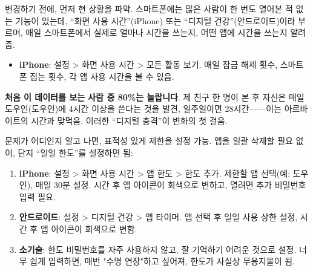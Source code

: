 


변경하기 전에, 먼저 현 상황을 파악. 스마트폰에는 많은 사람이 한 번도 열어본 적 없는 기능이 있는데, “화면 사용 시간”(iPhone) 또는 “디지털 건강”(안드로이드)이라 부르며, 매일 스마트폰에서 실제로 얼마나 시간을 쓰는지, 어떤 앱에 시간을 쓰는지 알려줌.

\begin{itemize}
  \item \textbf{iPhone}: 설정 > 화면 사용 시간 > 모든 활동 보기. 매일 잠금 해제 횟수, 스마트폰 집는 횟수, 각 앱 사용 시간을 볼 수 있음.
\end{itemize}

\textbf{처음 이 데이터를 보는 사람 중 80\%는 놀랍니다}. 제 친구 한 명이 본 후 자신은 매일 도우인(도우인)에 4시간 이상을 쓴다는 것을 발견, 일주일이면 28시간——이는 아르바이트의 시간과 맞먹음. 이러한 “디지털 충격”이 변화의 첫 걸음.


문제가 어디인지 알고 나면, 표적성 있게 제한을 설정 가능. 앱을 일괄 삭제할 필요 없이, 단지 “일일 한도”를 설정하면 됨:

\begin{enumerate}
  \item \textbf{iPhone}: 설정 > 화면 사용 시간 > 앱 한도 > 한도 추가. 제한할 앱 선택(예: 도우인), 매일 30분 설정. 시간 후 앱 아이콘이 회색으로 변하고, 열려면 추가 비밀번호 입력 필요.
  \item \textbf{안드로이드}: 설정 > 디지털 건강 > 앱 타이머. 앱 선택 후 일일 사용 상한 설정, 시간 후 앱 아이콘이 회색으로 변함.
  \item \textbf{소기술}: 한도 비밀번호를 자주 사용하지 않고, 잘 기억하기 어려운 것으로 설정. 너무 쉽게 입력하면, 매번 "수명 연장"하고 싶어져, 한도가 사실상 무용지물이 됨.
\end{enumerate}


